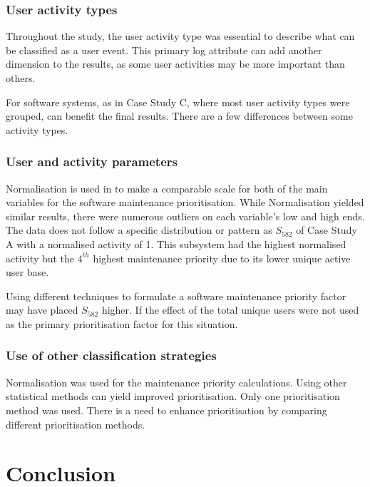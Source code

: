 \subsubsection{User activity types}
Throughout the study, the user activity type was essential to describe what can be classified as a user event. This primary log attribute can add another dimension to the results, as some user activities may be more important than others. \par For software systems, as in Case Study C, where most user activity types were grouped, can benefit the final results. There are a few differences between some activity types. 

\subsubsection{User and activity parameters}
\par Normalisation is used in  to make a comparable scale for both of the main variables for the software maintenance prioritisation. While Normalisation yielded similar results, there were numerous outliers on each variable's low and high ends. The data does not follow a specific distribution or pattern as $S_{582}$ of Case Study A with a normalised activity of 1. This subsystem had the highest normalised activity but the $4^{th}$ highest maintenance priority due to its lower unique active user base.\par Using different techniques to formulate a software maintenance priority factor may have placed $S_{582}$ higher. If the effect of the total unique users were not used as the primary prioritisation factor for this situation. 

\subsubsection{Use of other classification strategies}
Normalisation was used for the maintenance priority calculations. Using other statistical methods can yield improved prioritisation. Only one prioritisation method was used. There is a need to enhance prioritisation by comparing different prioritisation methods.

\clearpage

\section{Conclusion}

